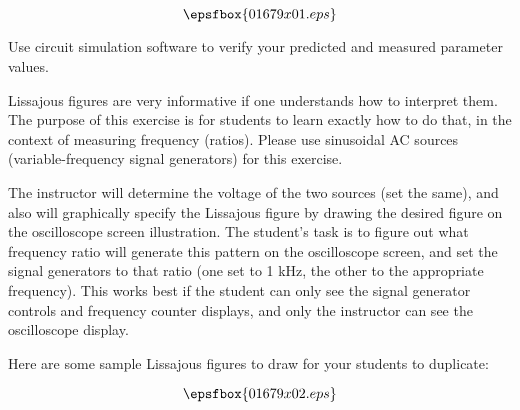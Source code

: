 

$$\epsfbox{01679x01.eps}$$

\vfil \eject






Use circuit simulation software to verify your predicted and measured parameter values.







Lissajous figures are very informative if one understands how to interpret them.  The purpose of this exercise is for students to learn exactly how to do that, in the context of measuring frequency (ratios).  Please use sinusoidal AC sources (variable-frequency signal generators) for this exercise.

The instructor will determine the voltage of the two sources (set the same), and also will graphically specify the Lissajous figure by drawing the desired figure on the oscilloscope screen illustration.  The student's task is to figure out what frequency ratio will generate this pattern on the oscilloscope screen, and set the signal generators to that ratio (one set to 1 kHz, the other to the appropriate frequency).  This works best if the student can only see the signal generator controls and frequency counter displays, and only the instructor can see the oscilloscope display.

Here are some sample Lissajous figures to draw for your students to duplicate:

$$\epsfbox{01679x02.eps}$$




